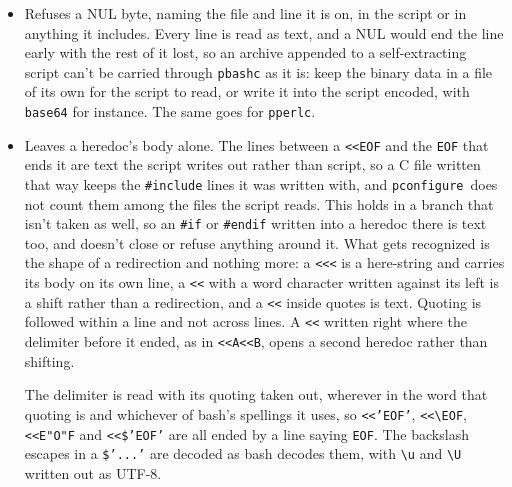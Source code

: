 \documentclass{article}
\newcommand{\pconfigure}{\texttt{pconfigure}}
\begin{document}
\begin{itemize}
  \texttt{\#ifndef} are the only conditionals a script has: to switch
  an \texttt{\#include} off, put it under an \texttt{\#ifdef} of a
  name nothing defines.  This applies in a branch that isn't taken
  too, and \pconfigure\ refuses the same line when it works out what
  the script depends on, or reads a test written in bash for its
  \texttt{\#pconfigure} lines.  A comment that starts with the word
  is caught as well, and is written \texttt{\# if} instead.
\item Refuses a NUL byte, naming the file and line it is on, in the
  script or in anything it includes.  Every line is read as text, and
  a NUL would end the line early with the rest of it lost, so an
  archive appended to a self-extracting script can't be carried
  through \texttt{pbashc} as it is: keep the binary data in a file of
  its own for the script to read, or write it into the script
  encoded, with \texttt{base64} for instance.  The same goes for
  \texttt{pperlc}.
\item Leaves a heredoc's body alone.  The lines between a
  \texttt{<<EOF} and the \texttt{EOF} that ends it are text the script
  writes out rather than script, so a C file written that way keeps
  the \texttt{\#include} lines it was written with, and \pconfigure\
  does not count them among the files the script reads.  This holds
  in a branch that isn't taken as well, so an \texttt{\#if} or
  \texttt{\#endif} written into a heredoc there is text too, and
  doesn't close or refuse anything around it.  What gets
  recognized is the shape of a redirection and nothing more: a
  \texttt{<<<} is a here-string and carries its body on its own line,
  a \texttt{<<} with a word character written against its left is a
  shift rather than a redirection, and a \texttt{<<} inside quotes is
  text.  Quoting is followed within a line and not across lines.  A
  \texttt{<<} written right where the delimiter before it ended, as in
  \texttt{<<A<<B}, opens a second heredoc rather than shifting.

  The delimiter is read with its quoting taken out, wherever in the
  word that quoting is and whichever of bash's spellings it uses, so
  \texttt{<<'EOF'}, \texttt{<<\textbackslash EOF}, \texttt{<<E"O"F}
  and \texttt{<<\$'EOF'} are all ended by a line saying \texttt{EOF}.
  The backslash escapes in a \texttt{\$'...'} are decoded as bash
  decodes them, with \texttt{\textbackslash u} and
  \texttt{\textbackslash U} written out as UTF-8.


\end{itemize}
\end{document}
